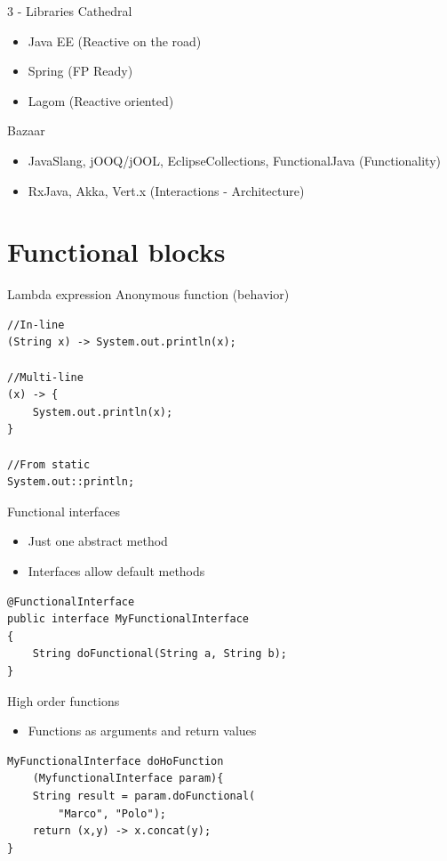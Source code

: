 \documentclass[14pt]{beamer}
\begin{document}
\begin{frame}{3 - Libraries}
    Cathedral
    \begin{itemize}
        \item Java EE (Reactive on the road)
        \item Spring (FP Ready)
        \item Lagom (Reactive oriented)
    \end{itemize}
    
    Bazaar
    \begin{itemize}
        \item JavaSlang, jOOQ/jOOL, EclipseCollections, FunctionalJava (Functionality)
        \item RxJava, Akka, Vert.x (Interactions - Architecture)
    \end{itemize}
\end{frame}



\section{Functional blocks}
\begin{frame}[fragile]{Lambda expression}
    Anonymous function (behavior)
    \begin{lstlisting}
//In-line
(String x) -> System.out.println(x);

//Multi-line
(x) -> {
    System.out.println(x);
}

//From static
System.out::println;
    \end{lstlisting}
\end{frame}

\begin{frame}[fragile]{Functional interfaces}
	\begin{itemize}
	\item Just one abstract method
	\item Interfaces allow default methods
	\end{itemize}
\begin{lstlisting}
@FunctionalInterface
public interface MyFunctionalInterface
{
	String doFunctional(String a, String b);
}
\end{lstlisting}
\end{frame}

\begin{frame}[fragile]{High order functions}
	\begin{itemize}
	\item Functions as arguments and return values
	\end{itemize}
\begin{lstlisting}
MyFunctionalInterface doHoFunction
    (MyfunctionalInterface param){
    String result = param.doFunctional(
        "Marco", "Polo");
    return (x,y) -> x.concat(y);
}
\end{lstlisting}
\end{frame}
\end{document}
